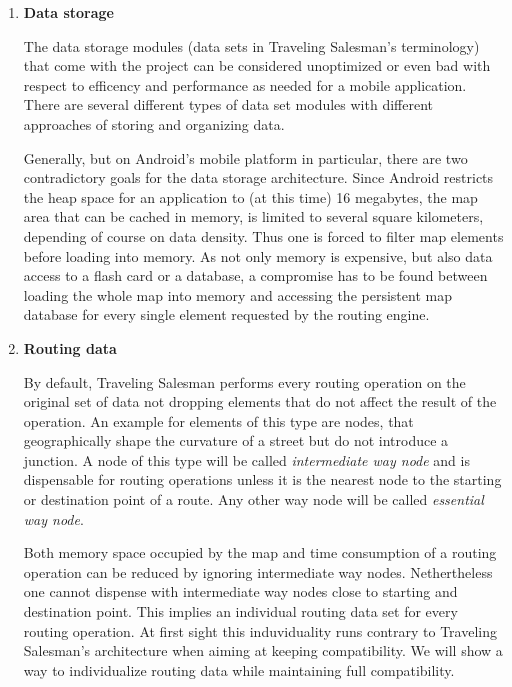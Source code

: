 \begin{enumerate}
	\item \textbf{Data storage}
	
		The data storage modules (data sets in Traveling Salesman's terminology) that come with the project can be considered unoptimized or even bad with respect to efficency and performance as needed for a mobile application. There are several different types of data set modules with different approaches of storing and organizing data.\newline
		
		Generally, but on Android's mobile platform in particular, there are two contradictory goals for the data storage architecture. Since Android restricts the heap space for an application to (at this time) 16 megabytes, the map area that can be cached in memory, is limited to several square kilometers, depending of course on data density. Thus one is forced to filter map elements before loading into memory.
		As not only memory is expensive, but also data access to a flash card or a database, a compromise has to be found between loading the whole map into memory and accessing the persistent map database for every single element requested by the routing engine.
				
	\item \textbf{Routing data}
	
		By default, Traveling Salesman performs every routing operation on the original set of data not dropping elements that do not affect the result of the operation. An example for elements of this type are nodes, that geographically shape the curvature of a street but do not introduce a junction. A node of this type will be called \emph{intermediate way node} and is dispensable for routing operations unless it is the nearest node to the starting or destination point of a route. Any other way node will be called \emph{essential way node}.\newline
		
		Both memory space occupied by the map and time consumption of a routing operation can be reduced by ignoring intermediate way nodes. Nethertheless one cannot dispense with intermediate way nodes close to starting and destination point. This implies an individual routing data set for every routing operation. At first sight this induviduality runs contrary to Traveling Salesman's architecture when aiming at keeping compatibility. We will show a way to individualize routing data while maintaining full compatibility.
											

\end{enumerate}
